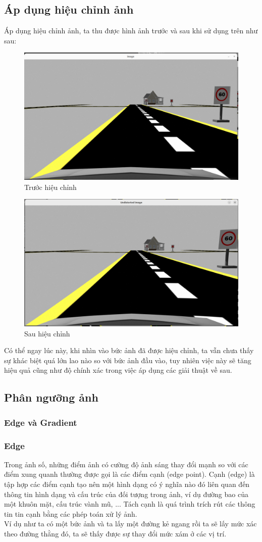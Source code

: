 \subsection{Áp dụng hiệu chỉnh ảnh}
Áp dụng hiệu chỉnh ảnh, ta thu được hình ảnh trước và sau khi sử dụng trên như sau:
\begin{figure}[htbp]
    \centering
    \includegraphics[width=0.6\linewidth]{images/3-lane/d._img.png}
    \caption{Trước hiệu chỉnh}
\end{figure}
\begin{figure}[htbp]
    \centering
    \includegraphics[width=0.6\linewidth]{images/3-lane/u._img.png}
    \caption{Sau hiệu chỉnh}
\end{figure}

\noindent Có thể ngay lúc này, khi nhìn vào bức ảnh đã được hiệu chỉnh, ta vẫn chưa thấy sự khác biệt quá lớn lao nào so với bức ảnh đầu vào, tuy nhiên việc này sẽ tăng hiệu quả cũng như độ chính xác trong việc áp dụng các giải thuật về sau.

\subsection{Phân ngưỡng ảnh}
\subsubsection{Edge và Gradient}
\subsubsection*{Edge}
Trong ảnh số, những điểm ảnh có cường độ ảnh sáng thay đổi mạnh so với các điểm xung quanh thường được gọi là các điểm cạnh (edge point). Cạnh (edge) là tập hợp các điểm cạnh tạo nên một hình dạng có ý nghĩa nào đó liên quan đến thông tin hình dạng và cấu trúc của đối tượng trong ảnh, ví dụ đường bao của một khuôn mặt, cấu trúc vành mũ, ... Tách cạnh là quá trình trích rút các thông tin tin cạnh bằng các phép toán xử lý ảnh.\\
Ví dụ như ta có một bức ảnh và ta lấy một đường kẻ ngang rồi ta sẽ lấy mức xác theo đường thằng đó, ta sẽ thấy được sự thay đổi mức xám ở các vị trí. \\

